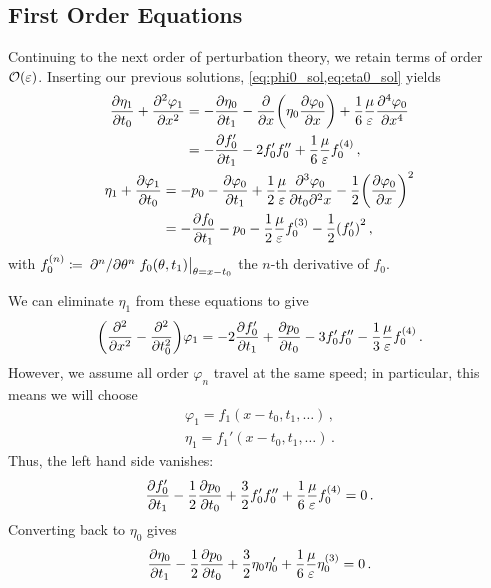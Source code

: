 \documentclass{jfm}
\let\Oldsubsection\subsection
\renewcommand{\subsection}{\FloatBarrier\Oldsubsection}
\renewcommand*{\epsilon}{\varepsilon}
\begin{document}
\subsection{\label{sec:int_first_order} First Order Equations}
Continuing to the next order of perturbation theory, we retain terms of
order $\order{\epsilon}$.
Inserting our previous solutions, \cref{eq:phi0_sol,eq:eta0_sol} yields
\begin{gather}
  \begin{aligned}
    \pdv{\eta_1}{t_0} + \pdv[2]{\varphi_{1}}{x} &=
      -\pdv{\eta_0}{t_1} - \pdv{x} \pqty{\eta_0 \pdv{\varphi_0}{x}} +
      \frac{1}{6} \frac{\mu}{\epsilon} \pdv[4]{\varphi_0}{x} \\
      &= -\pdv{f_0'}{t_1} - 2 f_0' f_0'' + \frac{1}{6}
      \frac{\mu}{\epsilon} f_0^{(4)} \,,
  \end{aligned}
  \\
  \begin{aligned}
    \eta_1 + \pdv{\varphi_1}{t_0} &= -p_0 -\pdv{\varphi_0}{t_1}
      + \frac{1}{2} \frac{\mu}{\epsilon} \frac{\partial^3 \varphi_0}
        {\partial t_0 \partial^2 x}
      - \frac{1}{2} \pqty{ \pdv{\varphi_0}{x} }^2 \\
    &= -\pdv{f_0}{t_1} - p_0 - \frac{1}{2} \frac{\mu}{\epsilon}
      f_0^{(3)} - \frac{1}{2} \pqty{f_0'}^2 \,,
  \end{aligned}
\end{gather}
with $f_0^{(n)} \coloneqq \eval{\pdv*[n]{\theta}
f_0(\theta,t_1)}_{\theta=x-t_0}$ the $n$-th derivative of $f_0$.

We can eliminate $\eta_1$ from these equations to give
\begin{equation}
  \pqty{\pdv[2]{x} - \pdv[2]{t_0}} \varphi_1 = -2 \pdv{f_0'}{t_1} +
    \pdv{p_0}{t_0} - 3 f_0' f_0'' - \frac{1}{3} \frac{\mu}{\epsilon}
    f_0^{(4)} \,.
\end{equation}
However, we assume all order $\varphi_{n}$ travel at the same speed; in
particular, this means we will choose
\begin{align}
  \varphi_1 = f_1(x-t_0,t_1,\ldots) \,, \label{eq:phi1_sol} \\
  \eta_1 = f_1'(x-t_0,t_1,\ldots) \,. \label{eq:eta1_sol}
\end{align}
Thus, the left hand side vanishes:
\begin{equation}
  \pdv{f_0'}{t_1} - \frac{1}{2} \pdv{p_0}{t_0} + \frac{3}{2} f_0' f_0''
    + \frac{1}{6} \frac{\mu}{\epsilon} f_0^{(4)} = 0\,.
\end{equation}
Converting back to $\eta_0$ gives
\begin{equation}
  \pdv{\eta_0}{t_1} - \frac{1}{2} \pdv{p_0}{t_0} + \frac{3}{2} \eta_0
  \eta_0' + \frac{1}{6} \frac{\mu}{\epsilon} \eta_0^{(3)} = 0\,.
\end{equation}
\end{document}
